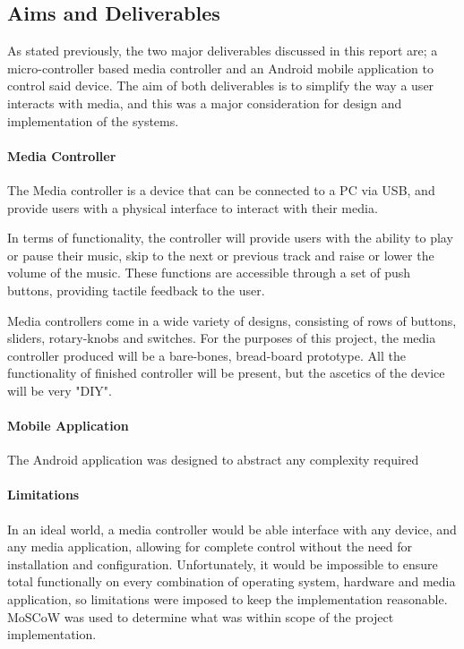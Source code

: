 \documentclass{article}
\begin{document}
		\subsection{Aims and Deliverables}
			As stated previously, the two major deliverables discussed in this report are; a micro-controller based media controller and an Android mobile application to control said device. The aim of both deliverables is to simplify the way a user interacts with media, and this was a major consideration for design and implementation of the systems.
			
			\paragraph{Media Controller}
				The Media controller is a device that can be connected to a PC via USB, and provide users with a physical interface to interact with their media. 
				
				In terms of functionality, the controller will provide users with the ability to play or pause their music, skip to the next or previous track and raise or lower the volume of the music. These functions are accessible through a set of push buttons, providing tactile feedback to the user.
				
				Media controllers come in a wide variety of designs, consisting of rows of buttons, sliders, rotary-knobs and switches. For the purposes of this project, the media controller produced will be a bare-bones, bread-board prototype. All the functionality of finished controller will be present, but the ascetics of the device will be very "DIY".
			
			\paragraph{Mobile Application}
				The Android application was designed to abstract any complexity required 
							
			\paragraph{Limitations}
				In an ideal world, a media controller would be able interface with any device, and any media application, allowing for complete control without the need for installation and configuration. Unfortunately, it would be impossible to ensure total functionally on every combination of operating system, hardware and media application, so limitations were imposed to keep the implementation reasonable. MoSCoW was used to determine what was within scope of the project implementation.
\end{document}
